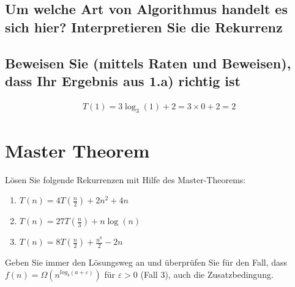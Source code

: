 \documentclass[12pt,letterpaper]{article}
\begin{document}
\subsection{Um welche Art von Algorithmus handelt es sich hier? Interpretieren Sie die Rekurrenz}

\subsection{Beweisen Sie (mittels Raten und Beweisen), dass Ihr Ergebnis aus 1.a) richtig ist}
\begin{align*}
    T(1) = 3\log_3(1) + 2 = 3 \times 0 + 2 = 2
\end{align*}


\section{Master Theorem}
Lösen Sie folgende Rekurrenzen mit Hilfe des Master-Theorems:
\begin{enumerate}[label=(\alph*)]
    \item $T(n) = 4 T(\frac{n}{2}) + 2n^2 + 4n$
    \item $T(n) = 27 T(\frac{n}{3}) + n \log(n)$
    \item $T(n) = 8 T(\frac{n}{2}) + \frac{n^8}{2} - 2n$
\end{enumerate}
Geben Sie immer den Lösungsweg an und überprüfen Sie für den Fall, dass
$f(n) = \Omega(n^{log_b(a + \varepsilon)})$ für $\varepsilon > 0$ (Fall 3), auch die Zusatzbedingung.

\pagebreak
\end{document}
